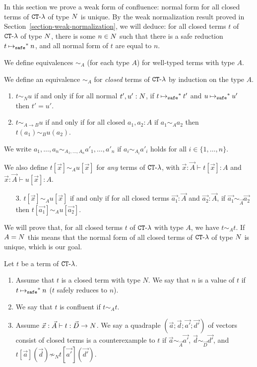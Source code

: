 In this section we prove a weak form of confluence: normal form for
all closed terms of ${ {\tt CT} \mbox{-} \lambda}$ of type ${N}$ is unique.
By the weak normalization result proved in Section~\ref{section-weak-normalization},
we will deduce: for all closed terms $t$ of ${ {\tt CT} \mbox{-} \lambda}$ of type ${N}$, 
there is some $n \in {N}$ such that there is a safe reduction $t \mathbin{\mathbin{\mapsto}_{\tiny \tt safe}}^* n$, and all normal form of $t$
are equal to $n$.

We define equivalences $\sim_A$ (for each type $A$) for well-typed terms with type $A$.
\begin{definition}
  We define an equivalence $\sim_A$ for \emph{closed} terms of ${ {\tt CT} \mbox{-} \lambda}$
  by induction on the type $A$. 
  \begin{enumerate}
  \item
    $t \sim_N u$ if and only if for all normal $t',u':{N}$, if $t \mathbin{\mathbin{\mapsto}_{\tiny \tt safe}}^* t'$
    and $u \mathbin{\mathbin{\mapsto}_{\tiny \tt safe}}^* u'$ then $t'=u'$.
  \item
    $t \sim_{A\rightarrow B} u$ if and only if for all closed $a_1,a_2:A$ if
    $a_1 \sim_A a_2$ then $t(a_1) \sim_B u(a_2)$.
  \end{enumerate}
  We write $a_1,\ldots,a_n \sim_{A_1,\ldots,A_n} a'_1,\ldots,a'_n$ if $a_i\sim_{A_i} a'_i$ holds
  for all $i\in\{1,\ldots,n\}$. 
  
  We also define $t[\vec{x}] \sim_A u[\vec{x}]$ for \emph{any} terms of ${ {\tt CT} \mbox{-} \lambda}$,
  with $\vec{x}:\vec{A}\vdash t[\vec{x}]:A$ and $\vec{x}:\vec{A}\vdash u[\vec{x}]:A$. 
  \begin{enumerate}
  \item[3.]
    $t[\vec{x}] \sim_A u[\vec{x}]$ if and only if for all closed terms $\vec{a_1}:\vec{A}$ and $\vec{a_2}:\vec{A}$,
    if $\vec{a_1}\sim_{\vec{A}}\vec{a_2}$ then $t[\vec{a_1}] \sim_A u[\vec{a_2}]$. 
  \end{enumerate}  
  
\end{definition}

We will prove that, for all closed terms $t$ of ${ {\tt CT} \mbox{-} \lambda}$ with type $A$, we have $t \sim_A t$.
If $A={N}$ this means that the normal form of all closed terms of ${ {\tt CT} \mbox{-} \lambda}$ of type ${N}$ is unique,
which is our goal.

\begin{definition}
  Let $t$ be a term of ${ {\tt CT} \mbox{-} \lambda}$. 
  \begin{enumerate}
  \item
    Assume that $t$ is a closed term with type $N$. 
    We say that $n$ is a value of $t$ if $t \mathbin{\mathbin{\mapsto}_{\tiny \tt safe}}^* n$ ($t$ safely reduces to $n$). 
  \item
    We say that $t$ is confluent if $t \sim_A t$.
  \item
    Assume $\vec{x}:\vec{A}\vdash t:\vec{D}\rightarrow{N}$. 
    We say a quadraple $(\vec{a};\vec{d};\vec{a'};\vec{d'})$ of vectors consist of closed terms
    is a counterexample to $t$ if
    $\vec{a}\sim_{\vec{A}}\vec{a'}$, $\vec{d}\sim_{\vec{D}}\vec{d'}$, and
    $t[\vec{a}](\vec{d}) \not\sim_N t[\vec{a'}](\vec{d'})$. 
  \end{enumerate}
\end{definition}

